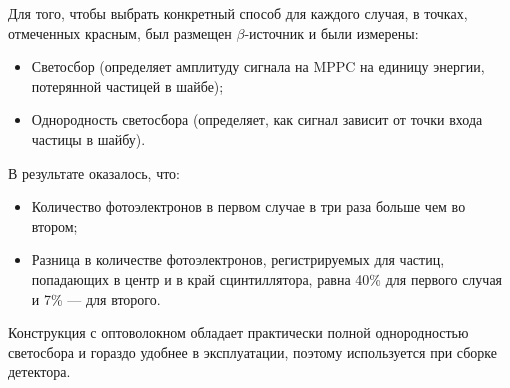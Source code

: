 \documentclass[a1paper,portrait, fontscale=0.575]{baposter}
\begin{document}
\begin{poster}
{\begin{multicols}{2}
\begin{center}
                \end{center}
            \end{multicols}
            Для того, чтобы выбрать конкретный способ для каждого случая, в точках, отмеченных красным, был размещен $\beta$-источник и были измерены:  
            \begin{itemize}
                \item{Светосбор (определяет амплитуду сигнала на MPPC на единицу энергии, потерянной частицей в шайбе);}
                \item{Однородность светосбора (определяет, как сигнал зависит от точки входа частицы в шайбу).}
            \end{itemize}
            В результате оказалось, что:
            \begin{itemize}
                \item{Количество фотоэлектронов в первом случае в три раза больше чем во втором; }
                \item{Разница в количестве фотоэлектронов, регистрируемых для частиц, попадающих в центр и в край сцинтиллятора, равна 40\% для первого случая и 7\% --- для второго. }
            \end{itemize}
            Конструкция с оптоволокном обладает практически полной однородностью светосбора и гораздо удобнее в эксплуатации, поэтому  используется при сборке детектора.
            
        }
        

\end{poster}
\end{document}
